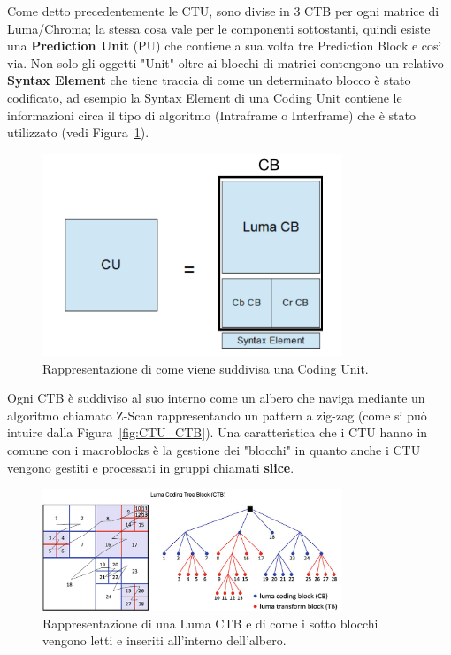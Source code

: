 \documentclass[a4paper,12pt, oneside]{article}
\begin{document}
Come detto precedentemente le CTU, sono divise in 3 CTB per ogni matrice di Luma/Chroma; la stessa
cosa vale per le componenti sottostanti, quindi esiste una \textbf{Prediction Unit} (PU) che contiene
a sua volta tre Prediction Block e così via. Non solo gli oggetti "Unit" oltre ai blocchi di matrici
contengono un relativo \textbf{Syntax Element} che tiene traccia di come un determinato blocco è
stato codificato, ad esempio la Syntax Element di una Coding Unit contiene le informazioni circa
 il tipo di algoritmo (Intraframe o Interframe) che è stato utilizzato (vedi Figura~\ref{fig:coding_unit}).
 
 \begin{figure}[h]
    \centering
    \includegraphics[width=0.8\textwidth]{images/coding-unit.png}
    \caption{Rappresentazione di come viene suddivisa una Coding Unit.}
    \label{fig:coding_unit}
\end{figure}

 \noindent Ogni CTB è suddiviso al suo interno come un albero che naviga mediante un algoritmo
chiamato Z-Scan rappresentando un pattern a zig-zag (come si può intuire dalla
Figura~\ref{fig:CTU_CTB}).
Una caratteristica che i CTU hanno in comune con i macroblocks è la gestione dei "blocchi"
in quanto anche i CTU vengono gestiti e processati in gruppi chiamati \textbf{slice}.

\begin{figure}[h]
    \centering
    \includegraphics[width=0.8\textwidth]{images/chroma-CTB.png}
    \caption{Rappresentazione di una Luma CTB e di come i sotto blocchi vengono letti e inseriti
    all'interno dell'albero.}
    \label{fig:chroma_CTB}
\end{figure}
\end{document}
